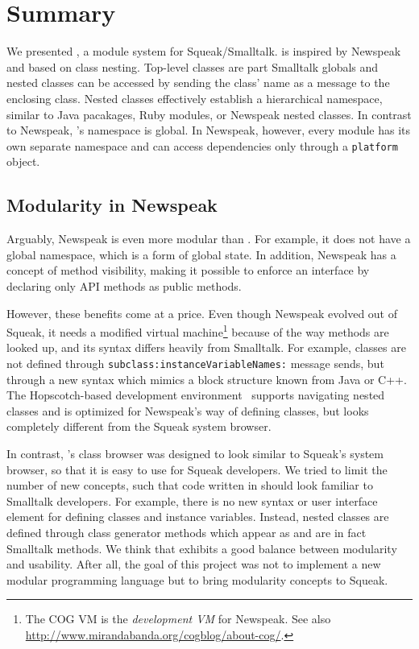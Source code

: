 \chapter{Summary}
\label{sec:summary}
We presented \msname, a module system for Squeak/Smalltalk. \msname is inspired by Newspeak and based on class nesting. Top-level classes are part Smalltalk globals and nested classes can be accessed by sending the class' name as a message to the enclosing class. Nested classes effectively establish a hierarchical namespace, similar to Java pacakages, Ruby modules, or Newspeak nested classes. In contrast to Newspeak, \msname's namespace is global. In Newspeak, however, every module has its own separate namespace and can access dependencies only through a \texttt{platform} object.

\section{Modularity in Newspeak}
Arguably, Newspeak is even more modular than \msname. For example, it does not have a global namespace, which is a form of global state. In addition, Newspeak has a concept of method visibility, making it possible to enforce an interface by declaring only API methods as public methods. 

However, these benefits come at a price. Even though Newspeak evolved out of Squeak, it needs a modified virtual machine\footnote{The COG VM is the \emph{development VM} for Newspeak. See also \url{http://www.mirandabanda.org/cogblog/about-cog/}.} because of the way methods are looked up, and its syntax differs heavily from Smalltalk. For example, classes are not defined through \texttt{subclass:instanceVariableNames:} message sends, but through a new syntax which mimics a block structure known from Java or C++. The Hopscotch-based development environment~\cite{Bykov08hopscotch:towards} supports navigating nested classes and is optimized for Newspeak's way of defining classes, but looks completely different from the Squeak system browser. 

In contrast, \msname's class browser was designed to look similar to Squeak's system browser, so that it is easy to use for Squeak developers. We tried to limit the number of new concepts, such that code written in \msname should look familiar to Smalltalk developers. For example, there is no new syntax or user interface element for defining classes and instance variables. Instead, nested classes are defined through class generator methods which appear as and are in fact Smalltalk methods. We think that \msname exhibits a good balance between modularity and usability. After all, the goal of this project was not to implement a new modular programming language but to bring modularity concepts to Squeak.


